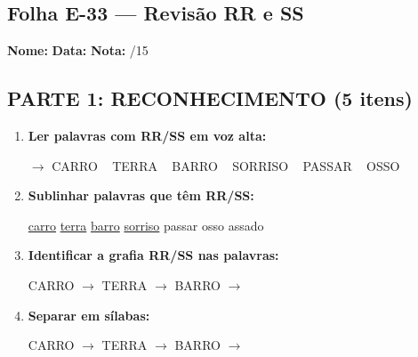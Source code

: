 \subsection{Folha E-33 --- Revisão RR e SS}
\begin{exercicio}



\noindent\textbf{Nome:} \underline{\hspace{3.2cm}} \quad \textbf{Data:} \underline{\hspace{1.6cm}} \quad \textbf{Nota:} \underline{\hspace{0.9cm}}/15


\subsection*{PARTE 1: RECONHECIMENTO (5 itens)}

\begin{enumerate}

  \item \textbf{Ler palavras com RR/SS em voz alta:}
  \begin{center}
  $\rightarrow$ CARRO ~ TERRA ~ BARRO ~ SORRISO ~ PASSAR ~ OSSO
  \end{center}

  \item \textbf{Sublinhar palavras que têm RR/SS:}

\begin{center}
  \uline{carro} \quad \uline{terra} \quad \uline{barro} \quad \uline{sorriso} \quad passar \quad osso \quad assado
\end{center}

  \item \textbf{Identificar a grafia RR/SS nas palavras:}
  \begin{center}
  CARRO $\rightarrow$ \underline{\hspace{1cm}} \quad TERRA $\rightarrow$ \underline{\hspace{1cm}} \quad BARRO $\rightarrow$ \underline{\hspace{1cm}}
  \end{center}

  \item \textbf{Separar em sílabas:}
  \begin{center}
  CARRO $\rightarrow$ \underline{\hspace{1.2cm}} \quad TERRA $\rightarrow$ \underline{\hspace{1.2cm}} \quad BARRO $\rightarrow$ \underline{\hspace{1.2cm}}
  \end{center}


\end{enumerate}
\end{exercicio}
